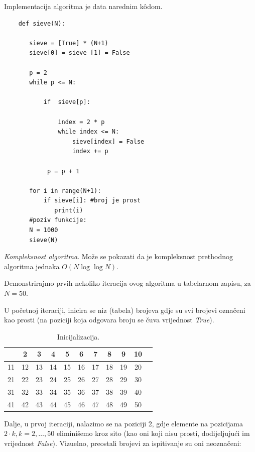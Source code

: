 Implementacija algoritma je data narednim k\^odom. 

\begin{verbatim}
	def sieve(N):
	   
	   sieve = [True] * (N+1)
	   sieve[0] = sieve [1] = False
	   
	   p = 2
	   while p <= N:
	       
	       if  sieve[p]:
	        
	           index = 2 * p
	           while index <= N:
	               sieve[index] = False
	               index += p
	           
	        p = p + 1
	   
	   for i in range(N+1):
	       if sieve[i]: #broj je prost
	          print(i)
       #poziv funkcije:
       N = 1000
       sieve(N)
\end{verbatim}  
\textit{Kompleksnost algoritma}.  Može se pokazati da je kompleksnost prethodnog algoritma jednaka $O(N \log\log N )$. 


Demonstrirajmo   prvih nekoliko iteracija ovog algoritma u tabelarnom zapisu, za $N=50.$ 

U početnoj iteraciji, inicira se niz (tabela) brojeva gdje su svi brojevi označeni kao prosti (na poziciji koja odgovara broju se čuva vrijednost \emph{True}).


\begin{table}[H]
	\centering
	\begin{tabular}{|c|c|c|c|c|c|c|c|c|c|c} \hline
       & 2 & 3 & 4 & 5 & 6 & 7 & 8 & 9 & 10 \\ \hline
    11 & 12 & 13 & 14 & 15 & 16 & 17 & 18 & 19 & 20 \\ \hline
    21 & 22 & 23 & 24 & 25 & 26 & 27 & 28 & 29 & 30 \\ \hline
    31 & 32 & 33 & 34 & 35 & 36 & 37 & 38 & 39 & 40 \\ \hline
    41 & 42 & 43 & 44 & 45 & 46 & 47 & 48 & 49 & 50 \\ \hline     
	\end{tabular}
    \caption{Inicijalizacija.} \label{eratosten-sieve-it-0}
\end{table}


Dalje, u prvoj iteraciji, nalazimo se na poziciji 2, gdje elemente na pozicijama $2 \cdot k, k=2, \ldots, 50$ eliminišemo kroz sito (kao oni koji nisu prosti, dodijeljujući im vrijednost \emph{False}). Vizuelno, preostali brojevi za ispitivanje su oni neoznačeni:


